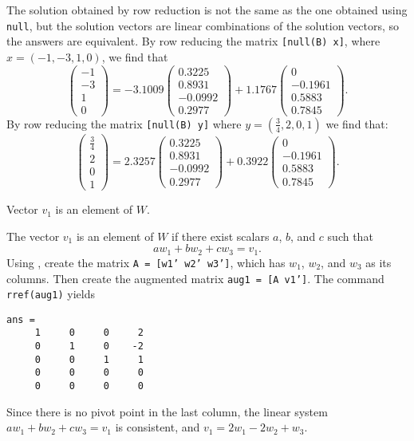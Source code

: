 \documentclass{ximera}
\begin{document}
The solution obtained by row reduction is not the same as the one
obtained using {\tt null}, but the solution vectors are linear
combinations of the \Matlab solution vectors, so the answers are
equivalent.  By row reducing the matrix {\tt [null(B) x]}, where
$x = (-1,-3,1,0)$, we find that
\[
\left(\begin{array}{r} -1 \\ -3 \\ 1 \\ 0 \end{array}\right) =
-3.1009\left(\begin{array}{r} 0.3225 \\ 0.8931 \\ -0.0992 \\ 0.2977
\end{array}\right) + 1.1767\left(\begin{array}{r} 0 \\ -0.1961 \\
0.5883 \\ 0.7845 \end{array}\right).
\]
By row reducing the matrix {\tt [null(B) y]} where $y = (\frac{3}{4},
2,0,1)$ we find that:
\[
\left(\begin{array}{r} \frac{3}{4} \\ 2 \\ 0 \\ 1 \end{array}\right) =
2.3257\left(\begin{array}{r} 0.3225 \\ 0.8931 \\ -0.0992 \\ 0.2977
\end{array}\right) + 0.3922\left(\begin{array}{r} 0 \\ -0.1961 \\
0.5883 \\ 0.7845 \end{array}\right).
\]

 \ans Vector $v_1$ is an element of $W$.

\soln The vector $v_1$ is an element of $W$ if there exist scalars $a$,
$b$, and $c$ such that
\[
aw_1 + bw_2 + cw_3 = v_1.
\]
Using \Matlab, create the matrix {\tt A = [w1' w2' w3']}, which has
$w_1$, $w_2$, and $w_3$ as its columns.  Then create the augmented
matrix {\tt aug1 = [A v1']}.  The command {\tt rref(aug1)} yields
\begin{verbatim}
ans =
     1     0     0     2
     0     1     0    -2
     0     0     1     1
     0     0     0     0
     0     0     0     0
\end{verbatim}
Since there is no pivot point in the last column, the linear system
$aw_1 + bw_2 + cw_3 = v_1$ is consistent, and $v_1 = 2w_1 - 2w_2 + w_3$.
\end{document}
